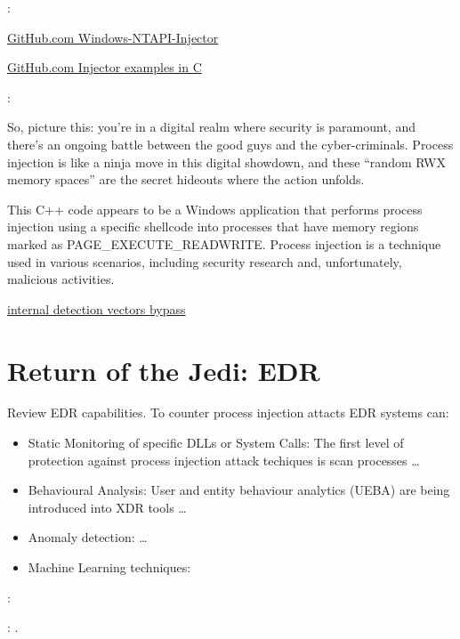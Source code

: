 \documentclass{article}
\begin{document}
\textbf{}: \textcite{S12h4ck:2023a}

\href{https://github.com/elddy/Windows-NTAPI-Injector}{GitHub.com Windows-NTAPI-Injector}

\href{https://gist.github.com/WKL-Sec/96e17188e4c159c2cdf7ff2c111130cc#file-local-c}{GitHub.com Injector examples in C}

\textbf{}: \textcite{S12h4ck:2023b}

So, picture this: you’re in a digital realm where security is paramount, and there’s an ongoing battle between the good guys and the cyber-criminals. Process injection is like a ninja move in this digital showdown, and these “random RWX memory spaces” are the secret hideouts where the action unfolds.

This C++ code appears to be a Windows application that performs process injection using a specific shellcode into processes that have memory regions marked as PAGE_EXECUTE_READWRITE. Process injection is a technique used in various scenarios, including security research and, unfortunately, malicious activities.


\href{https://www.unknowncheats.me/forum/anti-cheat-bypass/286274-internal-detection-vectors-bypass.html}{internal detection vectors bypass}



\section{Return of the Jedi: EDR}

Review EDR capabilities.  To counter process injection attacts EDR systems can:

\begin{itemize}
\item Static Monitoring of specific DLLs or System Calls: The first level of protection against process injection attack techiques is
  scan processes \ldots
\item Behavioural Analysis: User and entity behaviour analytics (UEBA) are being introduced into XDR tools \ldots
\item Anomaly detection: \autocite{Pek:2016} \ldots
\item Machine Learning techniques: \autocite{Wang:2022}
\end{itemize}


\textbf{} \textcite{Jang:2007}:

\textbf{}: \textcite{Inam:2023}.
\end{document}
